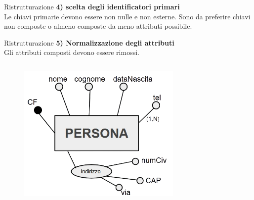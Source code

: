 %
\begin{frame}{Ristrutturazione}
\vspace{-3cm}
\textbf{4) scelta degli identificatori primari}
\\\vspace{2em}
Le chiavi primarie devono essere non nulle e non esterne. Sono da preferire chiavi non composte o almeno composte da meno attributi possibile.
\end{frame}
%
\begin{frame}{Ristrutturazione}
\textbf{5) Normalizzazione degli attributi}
\\\vspace{2em}
Gli attributi composti devono essere rimossi.
\begin{columns}
        \begin{column}{0.5\textwidth}
            \begin{figure}[h]
        \centering
        \includegraphics[width=0.75\textwidth]{img/i10.png}
    \end{figure}
        \end{column}
        \begin{column}{0.5\textwidth}
\end{column}
\end{columns}
\end{frame}
